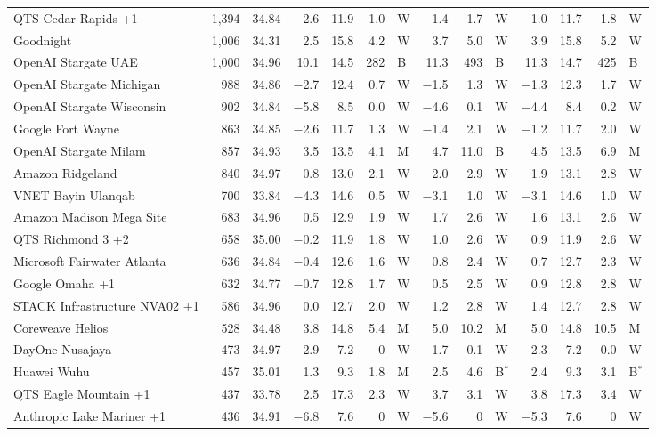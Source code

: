 {\begin{longtable}{@{}lrrrrrlrrlrrrl@{}}
QTS Cedar Rapids +1 & 1,394 & 34.84 & $-$2.6 & 11.9 & 1.0 & W & $-$1.4 & 1.7 & W & $-$1.0 & 11.7 & 1.8 & W \\
Goodnight & 1,006 & 34.31 & 2.5 & 15.8 & 4.2 & W & 3.7 & 5.0 & W & 3.9 & 15.8 & 5.2 & W \\
OpenAI Stargate UAE & 1,000 & 34.96 & 10.1 & 14.5 & 282 & B & 11.3 & 493 & B & 11.3 & 14.7 & 425 & B \\
OpenAI Stargate Michigan & 988 & 34.86 & $-$2.7 & 12.4 & 0.7 & W & $-$1.5 & 1.3 & W & $-$1.3 & 12.3 & 1.7 & W \\
OpenAI Stargate Wisconsin & 902 & 34.84 & $-$5.8 & 8.5 & 0.0 & W & $-$4.6 & 0.1 & W & $-$4.4 & 8.4 & 0.2 & W \\
Google Fort Wayne & 863 & 34.85 & $-$2.6 & 11.7 & 1.3 & W & $-$1.4 & 2.1 & W & $-$1.2 & 11.7 & 2.0 & W \\
OpenAI Stargate Milam & 857 & 34.93 & 3.5 & 13.5 & 4.1 & M & 4.7 & 11.0 & B & 4.5 & 13.5 & 6.9 & M \\
Amazon Ridgeland & 840 & 34.97 & 0.8 & 13.0 & 2.1 & W & 2.0 & 2.9 & W & 1.9 & 13.1 & 2.8 & W \\
VNET Bayin Ulanqab & 700 & 33.84 & $-$4.3 & 14.6 & 0.5 & W & $-$3.1 & 1.0 & W & $-$3.1 & 14.6 & 1.0 & W \\
Amazon Madison Mega Site & 683 & 34.96 & 0.5 & 12.9 & 1.9 & W & 1.7 & 2.6 & W & 1.6 & 13.1 & 2.6 & W \\
QTS Richmond 3 +2 & 658 & 35.00 & $-$0.2 & 11.9 & 1.8 & W & 1.0 & 2.6 & W & 0.9 & 11.9 & 2.6 & W \\
Microsoft Fairwater Atlanta & 636 & 34.84 & $-$0.4 & 12.6 & 1.6 & W & 0.8 & 2.4 & W & 0.7 & 12.7 & 2.3 & W \\
Google Omaha +1 & 632 & 34.77 & $-$0.7 & 12.8 & 1.7 & W & 0.5 & 2.5 & W & 0.9 & 12.8 & 2.8 & W \\
STACK Infrastructure NVA02 +1 & 586 & 34.96 & 0.0 & 12.7 & 2.0 & W & 1.2 & 2.8 & W & 1.4 & 12.7 & 2.8 & W \\
Coreweave Helios & 528 & 34.48 & 3.8 & 14.8 & 5.4 & M & 5.0 & 10.2 & M & 5.0 & 14.8 & 10.5 & M \\
DayOne Nusajaya & 473 & 34.97 & $-$2.9 & 7.2 & 0 & W & $-$1.7 & 0.1 & W & $-$2.3 & 7.2 & 0.0 & W \\
Huawei Wuhu & 457 & 35.01 & 1.3 & 9.3 & 1.8 & M & 2.5 & 4.6 & B$^{\ast}$ & 2.4 & 9.3 & 3.1 & B$^{\ast}$ \\
QTS Eagle Mountain +1 & 437 & 33.78 & 2.5 & 17.3 & 2.3 & W & 3.7 & 3.1 & W & 3.8 & 17.3 & 3.4 & W \\
Anthropic Lake Mariner +1 & 436 & 34.91 & $-$6.8 & 7.6 & 0 & W & $-$5.6 & 0 & W & $-$5.3 & 7.6 & 0 & W \\

\end{longtable}}
